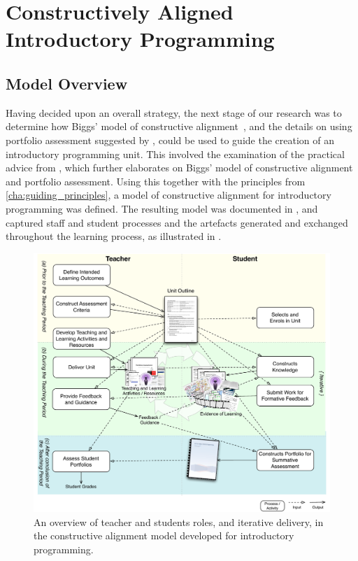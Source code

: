 
\clearpage
\section{Constructively Aligned Introductory Programming} %
\label{sec:model}

\subsection{Model Overview} %
\label{sub:model_overview}

Having decided upon an overall strategy, the next stage of our research was to determine how Biggs' model of constructive alignment~\cite{Biggs:1996c}, and the details on using portfolio assessment suggested by \citet{Biggs:1997}, could be used to guide the creation of an introductory programming unit. This involved the examination of the practical advice from \citet{Biggs:2007}, which further elaborates on Biggs' model of constructive alignment and portfolio assessment. Using this together with the principles from \cref{cha:guiding_principles}, a model of constructive alignment for introductory programming was defined. The resulting model was documented in \citet{Cain:2012a}, and captured staff and student processes and the artefacts generated and exchanged throughout the learning process, as illustrated in .

\begin{figure}[htbp]
	\centering
	\includegraphics[width=\textwidth]{ProcessOverview}
	\caption{An overview of teacher and students roles, and iterative delivery, in the constructive alignment model developed for introductory programming.}
	\label{fig:process_overview}
\end{figure}

